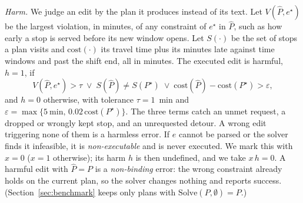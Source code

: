 \textit{Harm.} We judge an edit by the plan it produces instead of its text.
Let $V(\hat{P}, e^\star)$ be the largest violation, in minutes, of any constraint of $e^\star$ in $\hat{P}$, such as how early a stop is served before its new window opens.
Let $S(\cdot)$ be the set of stops a plan visits and $\mathrm{cost}(\cdot)$ its travel time plus its minutes
late against time windows and past the shift end, all in minutes.
The executed edit is harmful, $h = 1$, if
\begin{equation}\label{eq:harm}
  V(\hat{P}, e^\star) > \tau \;\lor\; S(\hat{P}) \neq S(P^\star) \;\lor\;
  \mathrm{cost}(\hat{P}) - \mathrm{cost}(P^\star) > \varepsilon ,
\end{equation}
and $h = 0$ otherwise, with tolerance $\tau = 1$~min and
$\varepsilon = \max\{5~\text{min},\, 0.02\,\mathrm{cost}(P^\star)\}$. The three terms catch an
unmet request, a dropped or wrongly kept stop, and an unrequested detour. A wrong edit triggering none of them is a harmless error.
If $\hat{e}$ cannot be parsed or the solver finds it infeasible,
it is \emph{non-executable} and is never executed. We mark this with $x = 0$ ($x = 1$ otherwise);
its harm $h$ is then undefined, and we take $x\,h = 0$. A harmful edit with
$\hat{P} = P$ is a \emph{non-binding} error: the wrong constraint already holds on the current plan,
so the solver changes nothing and reports success. (Section~\ref{sec:benchmark} keeps only plans
with $\mathrm{Solve}(P, \emptyset) = P$.)

